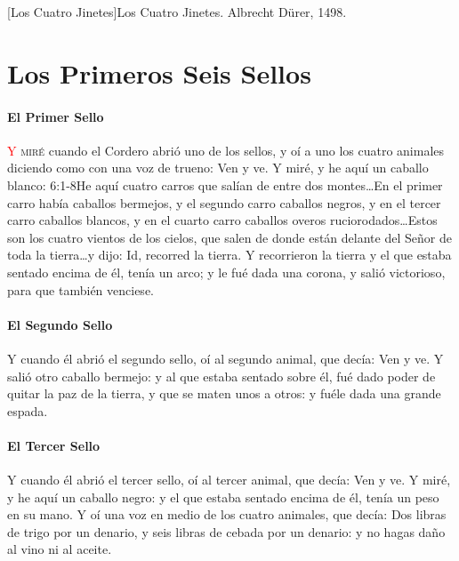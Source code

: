[Los Cuatro Jinetes]{Los Cuatro Jinetes. Albrecht Dürer, 1498.}

\chapter{Los Primeros Seis Sellos}
\subsubsection*{El Primer Sello}
\lettrine[lines=3,slope=-0.5em,loversize=0.1]{\textcolor{red}{Y}}{\hspace{0.5em} miré} cuando el Cordero abrió uno de los sellos, y oí a uno los cuatro animales diciendo como con una voz de trueno: Ven y ve. 
Y miré, y he aquí un caballo blanco:%
					{6:1-8}{He aquí cuatro carros que salían de entre dos montes\ldots En el primer carro había caballos bermejos, y el segundo carro caballos negros, y en el tercer carro caballos blancos, y en el cuarto carro caballos overos ruciorodados\ldots Estos son los cuatro vientos de los cielos, que salen de donde están delante del Señor de toda la tierra\ldots y dijo: Id, recorred la tierra. Y recorrieron la tierra}
 y el que estaba sentado encima de él, tenía un arco; y le fué dada una corona, y salió victorioso, para que también venciese.
\subsubsection*{El Segundo Sello}
Y cuando él abrió el segundo sello, oí al segundo animal, que decía: Ven y ve. %
Y salió otro caballo bermejo: y al que estaba sentado sobre él, fué dado poder de quitar la paz de la tierra, y que se maten unos a otros: y fuéle dada una grande espada.
\subsubsection*{El Tercer Sello}
Y cuando él abrió el tercer sello, oí al tercer animal, que decía: Ven y ve. Y miré, y he aquí un caballo negro: y el que estaba sentado encima de él, tenía un peso en su mano. %
Y oí una voz en medio de los cuatro animales, que decía: Dos libras de trigo por un denario, y seis libras de cebada por un denario: y no hagas daño al vino ni al aceite.
